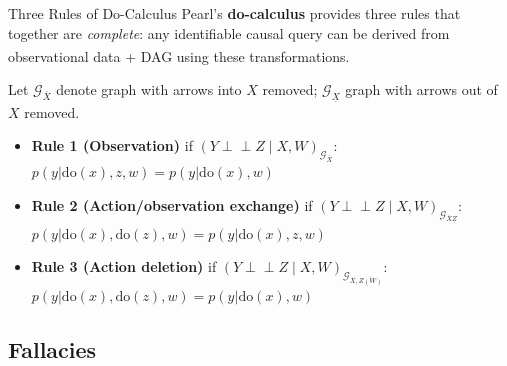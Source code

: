 \begin{v3topic}{Three Rules of Do-Calculus}
    Pearl’s \textbf{do-calculus} provides three rules that together are
    \emph{complete}: any identifiable causal query can be derived from
    observational data + DAG using these
    transformations.\textsuperscript{\cite[][pp.~85--87]{pearlCausalityModelsReasoning2009}}

    Let $\mathcal{G}_{\overline{X}}$ denote graph with arrows into $X$ removed;
    $\mathcal{G}_{\underline{X}}$ graph with arrows out of $X$ removed.

    \begin{itemize}
        \item \textbf{Rule 1 (Observation)} if $(Y \perp\!\!\!\perp Z \mid X,W)_{\mathcal{G}_{\overline{X}}}$:
            $p(y|\mathrm{do}(x),z,w) = p(y|\mathrm{do}(x),w)$
        \item \textbf{Rule 2 (Action/observation exchange)} if
            $(Y \perp\!\!\!\perp Z \mid X,W)_{\mathcal{G}_{\overline{X}\underline{Z}}}$:
            $p(y|\mathrm{do}(x),\mathrm{do}(z),w) = p(y|\mathrm{do}(x),z,w)$
        \item \textbf{Rule 3 (Action deletion)} if
            $(Y \perp\!\!\!\perp Z \mid X,W)_{\mathcal{G}_{\overline{X},\overline{Z(W)}}}$:
            $p(y|\mathrm{do}(x),\mathrm{do}(z),w) = p(y|\mathrm{do}(x),w)$
    \end{itemize}

\end{v3topic}

    \subsection{Fallacies}

